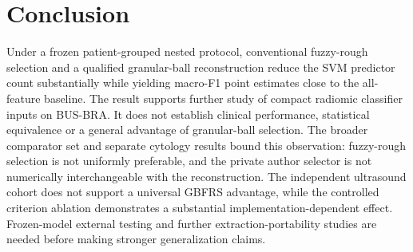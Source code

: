 \documentclass[11pt,a4paper]{article}
\begin{document}
\section{Conclusion}
Under a frozen patient-grouped nested protocol, conventional fuzzy-rough selection and a qualified granular-ball reconstruction reduce the SVM predictor count substantially while yielding macro-F1 point estimates close to the all-feature baseline. The result supports further study of compact radiomic classifier inputs on BUS-BRA. It does not establish clinical performance, statistical equivalence or a general advantage of granular-ball selection. The broader comparator set and separate cytology results bound this observation: fuzzy-rough selection is not uniformly preferable, and the private author selector is not numerically interchangeable with the reconstruction. The independent ultrasound cohort does not support a universal GBFRS advantage, while the controlled criterion ablation demonstrates a substantial implementation-dependent effect. Frozen-model external testing and further extraction-portability studies are needed before making stronger generalization claims.
\end{document}
